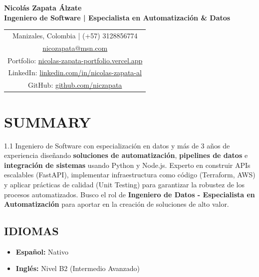 \documentclass[11pt, a4paper]{article}
\begin{document}
\begin{center}
	{\Huge \textbf{Nicolás Zapata Álzate}} \\[6pt]
	{\large \textbf{Ingeniero de Software | Especialista en Automatización \& Datos}} \\[12pt]
	\begin{tabular}{@{}c@{}}
		Manizales, Colombia | (+57) 3128856774                                                              \\
		\href{mailto:nicozapata@msn.com}{nicozapata@msn.com}                                                \\
		Portfolio: \href{https://nicolas-zapata-portfolio.vercel.app/}{nicolas-zapata-portfolio.vercel.app} \\
		LinkedIn: \href{https://www.linkedin.com/in/nicolas-zapata-al/}{linkedin.com/in/nicolas-zapata-al}  \\
		GitHub: \href{https://github.com/niczapata}{github.com/niczapata}                                   \\
	\end{tabular}
\end{center}

\section*{SUMMARY}
\begin{spacing}{1.1}
	Ingeniero de Software con especialización en datos y más de 3 años de experiencia diseñando \textbf{soluciones de automatización}, \textbf{pipelines de datos} e \textbf{integración de sistemas} usando Python y Node.js. Experto en construir APIs escalables (FastAPI), implementar infraestructura como código (Terraform, AWS) y aplicar prácticas de calidad (Unit Testing) para garantizar la robustez de los procesos automatizados. Busco el rol de \textbf{Ingeniero de Datos - Especialista en Automatización} para aportar en la creación de soluciones de alto valor.
\end{spacing}

\subsection*{IDIOMAS}
\begin{itemize}[leftmargin=*, nosep]
	\item \textbf{Español:} Nativo
	\item \textbf{Inglés:} Nivel B2 (Intermedio Avanzado)
\end{itemize}
\end{document}
